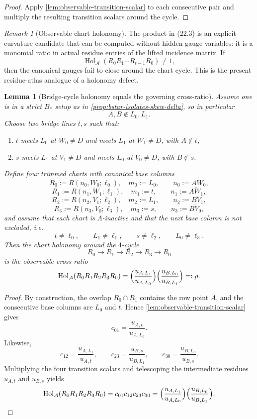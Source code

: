 \documentclass[11pt]{amsart}
\numberwithin{equation}{section}
\theoremstyle{plain}
\newtheorem{lemma}[theorem]{Lemma}
\theoremstyle{definition}
\theoremstyle{remark}
\newtheorem{remark}[theorem]{Remark}
\newcommand{\Lam}{\Lambda}
\begin{document}
\begin{proof}
Apply \cref{lem:observable-transition-scalar} to each consecutive pair and multiply the resulting transition scalars around the cycle.
\end{proof}

\begin{remark}[Observable chart holonomy]
\label{rem:observable-holonomy-curvature}
The product in \textup{(22.3)} is an explicit curvature candidate that can be computed without hidden gauge variables:
it is a monomial ratio in actual residue entries of the lifted incidence matrix. If
\[
\operatorname{Hol}_{\mathcal A}(R_0R_1\cdots R_{t-1}R_0)\neq 1,
\]
then the canonical gauges fail to close around the chart cycle. This is the present residue-atlas analogue of a holonomy defect.
\end{remark}

\begin{lemma}[Bridge-cycle holonomy equals the governing cross-ratio]
\label{lem:bridge-cycle-holonomy-rho}
Assume one is in a strict $B_*$ setup as in \cref{prop:bstar-isolates-skew-delta}, so in particular
\[
A,B\notin L_0,L_1.
\]
Choose two bridge lines $t,s$ such that:
\begin{enumerate}[leftmargin=2em,label=(\roman*)]
  \item $t$ meets $L_0$ at $W_0\neq D$ and meets $L_1$ at $W_1\neq D$, with $A\notin t$;
  \item $s$ meets $L_1$ at $V_1\neq D$ and meets $L_0$ at $V_0\neq D$, with $B\notin s$.
\end{enumerate}
Define four trimmed charts with canonical base columns
\[
R_0:=R(n_0,W_0;\ell_0),\quad m_0:=L_0,\qquad n_0:=\overline{AW_0},
\]
\[
R_1:=R(n_1,W_1;\ell_1),\quad m_1:=t,\qquad n_1:=\overline{AW_1},
\]
\[
R_2:=R(n_2,V_1;\ell_2),\quad m_2:=L_1,\qquad n_2:=\overline{BV_1},
\]
\[
R_3:=R(n_3,V_0;\ell_3),\quad m_3:=s,\qquad n_3:=\overline{BV_0},
\]
and assume that each chart is $\Lam$-inactive and that the next base column is not excluded, i.e.
\[
t\neq \ell_0,\qquad L_1\neq \ell_1,\qquad s\neq \ell_2,\qquad L_0\neq \ell_3.
\]
Then the chart holonomy around the $4$-cycle
\[
R_0\to R_1\to R_2\to R_3\to R_0
\]
is the observable cross-ratio
\[
\operatorname{Hol}_{\mathcal A}(R_0R_1R_2R_3R_0)
=\Bigl(\frac{u_{A,L_1}}{u_{A,L_0}}\Bigr)
 \Bigl(\frac{u_{B,L_0}}{u_{B,L_1}}\Bigr)
=:\rho.
\]
\end{lemma}

\begin{proof}
By construction, the overlap $R_0\cap R_1$ contains the row point $A$, and the consecutive base columns are $L_0$ and $t$. Hence
\cref{lem:observable-transition-scalar} gives
\[
c_{01}=\frac{u_{A,t}}{u_{A,L_0}}.
\]
Likewise,
\[
c_{12}=\frac{u_{A,L_1}}{u_{A,t}},
\qquad
c_{23}=\frac{u_{B,s}}{u_{B,L_1}},
\qquad
c_{30}=\frac{u_{B,L_0}}{u_{B,s}}.
\]
Multiplying the four transition scalars and telescoping the intermediate residues $u_{A,t}$ and $u_{B,s}$ yields
\[
\operatorname{Hol}_{\mathcal A}(R_0R_1R_2R_3R_0)
=c_{01}c_{12}c_{23}c_{30}
=\Bigl(\frac{u_{A,L_1}}{u_{A,L_0}}\Bigr)
 \Bigl(\frac{u_{B,L_0}}{u_{B,L_1}}\Bigr).
\]
\end{proof}
\end{document}
